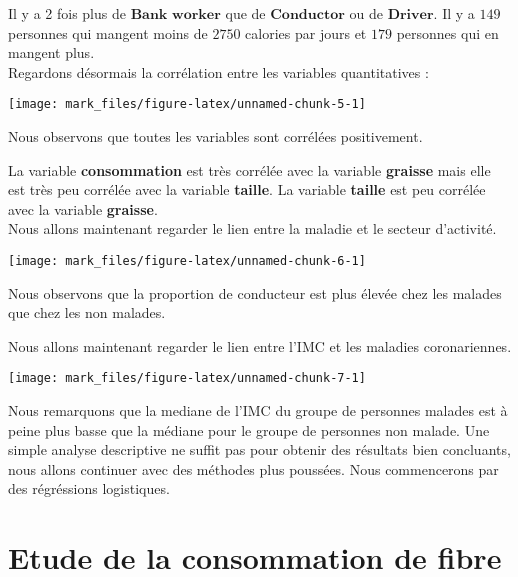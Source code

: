 \documentclass[
]{article}
\begin{document}
Il y a 2 fois plus de \(\textbf{Bank worker}\) que de
\(\textbf{Conductor}\) ou de \(\textbf{Driver}\). Il y a \(149\)
personnes qui mangent moins de \(2750\) calories par jours et \(179\)
personnes qui en mangent plus.\\

Regardons désormais la corrélation entre les variables quantitatives :\\

\begin{center}\texttt{[image: mark\_files/figure-latex/unnamed-chunk-5-1]} \end{center}

Nous observons que toutes les variables sont corrélées positivement. ~

La variable \textbf{consommation} est très corrélée avec la variable
\textbf{graisse} mais elle est très peu corrélée avec la variable
\textbf{taille}. La variable \textbf{taille} est peu corrélée avec la
variable \textbf{graisse}.\\

Nous allons maintenant regarder le lien entre la maladie et le secteur
d'activité.\\

\begin{center}\texttt{[image: mark\_files/figure-latex/unnamed-chunk-6-1]} \end{center}

Nous observons que la proportion de conducteur est plus élevée chez les
malades que chez les non malades.

Nous allons maintenant regarder le lien entre l'IMC et les maladies
coronariennes.

\begin{center}\texttt{[image: mark\_files/figure-latex/unnamed-chunk-7-1]} \end{center}

Nous remarquons que la mediane de l'IMC du groupe de personnes malades
est à peine plus basse que la médiane pour le groupe de personnes non
malade. Une simple analyse descriptive ne suffit pas pour obtenir des
résultats bien concluants, nous allons continuer avec des méthodes plus
poussées. Nous commencerons par des régréssions logistiques.

\hypertarget{etude-de-la-consommation-de-fibre}{%
\section{Etude de la consommation de
fibre}\label{etude-de-la-consommation-de-fibre}}
\end{document}
